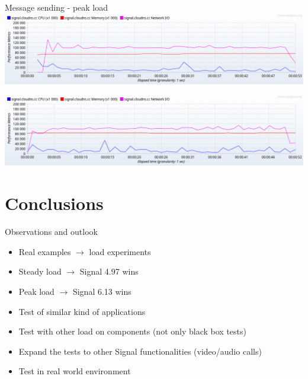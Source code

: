 \documentclass{beamer}
\begin{document}
\begin{frame}{Message sending - peak load}
    \centering
    \includegraphics[width=\textwidth]{img/4.97-peak-message}

    \vfill

    \centering
    \includegraphics[width=\textwidth]{img/6.13-peak-message}
\end{frame}

\section{Conclusions}

\begin{frame}{Observations and outlook}
    \begin{block}{}
        \begin{itemize}
            \item Real examples \(\rightarrow\) load experiments
            \item Steady load \(\rightarrow\) Signal 4.97 wins
            \item Peak load \(\rightarrow\) Signal 6.13 wins
            \item Test of similar kind of applications
            \item Test with other load on components (not only black box tests)
            \item Expand the tests to other Signal functionalities (video/audio calls)
            \item Test in real world environment
        \end{itemize}
    \end{block}
\end{frame}
\end{document}
